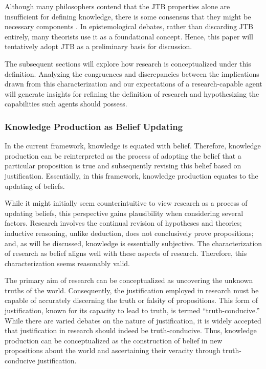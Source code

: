 \documentclass{article}
\begin{document}
Although many philosophers contend that the JTB properties alone are insufficient for defining knowledge, there is some consensus that they might be necessary components \cite{sep-epistemology}. In epistemological debates, rather than discarding JTB entirely, many theorists use it as a foundational concept. Hence, this paper will tentatively adopt JTB as a preliminary basis for discussion. 

The subsequent sections will explore how research is conceptualized under this definition. Analyzing the congruences and discrepancies between the implications drawn from this characterization and our expectations of a research-capable agent will generate insights for refining the definition of research and hypothesizing the capabilities such agents should possess.

\subsubsection{Knowledge Production as Belief Updating}
In the current framework, knowledge is equated with belief. Therefore, knowledge production can be reinterpreted as the process of adopting the belief that a particular proposition is true and subsequently revising this belief based on justification. Essentially, in this framework, knowledge production equates to the updating of beliefs.

While it might initially seem counterintuitive to view research as a process of updating beliefs, this perspective gains plausibility when considering several factors. Research involves the continual revision of hypotheses and theories; inductive reasoning, unlike deduction, does not conclusively prove propositions; and, as will be discussed, knowledge is essentially subjective. The characterization of research as belief aligns well with these aspects of research. Therefore, this characterization seems reasonably valid.

The primary aim of research can be conceptualized as uncovering the unknown truths of the world. Consequently, the justification employed in research must be capable of accurately discerning the truth or falsity of propositions. This form of justification, known for its capacity to lead to truth, is termed ``truth-conducive.'' While there are varied debates on the nature of justification, it is widely accepted that justification in research should indeed be truth-conducive. Thus, knowledge production can be conceptualized as the construction of belief in new propositions about the world and ascertaining their veracity through truth-conducive justification.
\end{document}
